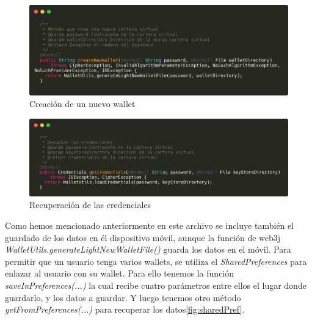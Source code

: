 % 

\begin{figure}[h!]
  \centering
  \includegraphics[width=0.8\linewidth]{figs/Desarrollo/SDK/crearWallet}
  \caption[Creación de un nuevo wallet]{Creación de un nuevo wallet}
  \label{fig:crearWallet}
\end{figure}

\begin{figure}[h!]
  \centering
  \includegraphics[width=0.8\linewidth]{figs/Desarrollo/SDK/recuperarCredenciales}
  \caption[Recuperación de las credenciales]{Recuperación de las credenciales}
  \label{fig:recuperarCredenciales}
\end{figure}

Como hemos mencionado anteriormente en este archivo se incluye también el guardado de los datos en él dispositivo móvil, aunque la función de web3j \textit{WalletUtils.generateLightNewWalletFile()} guarda los datos en el móvil. Para permitir que un usuario tenga varios wallets, se utiliza el \emph{SharedPreferences} para enlazar al usuario con su wallet. Para ello tenemos la función \textit{saveInPreferences(...)} la cual recibe cuatro parámetros entre ellos el lugar donde guardarlo, y los datos a guardar. Y luego tenemos otro método \textit{getFromPreferences(...)} para recuperar los datos\ref{fig:sharedPref}. \\

